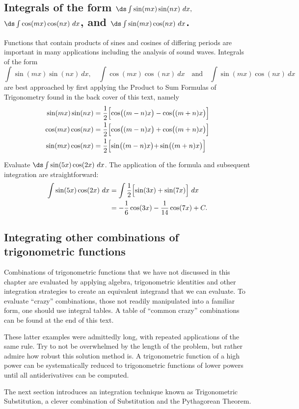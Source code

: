 \subsection{\texorpdfstring{Integrals of the form $\ds \int\sin(mx)\sin(nx)\ dx,$ $\ds\int \cos(mx)\cos(nx)\ dx$, and $\ds\int \sin(mx)\cos(nx)\ dx$.}{Integrands of the form sin(mx)sin(nx), cos(mx)cos(nx), and sin(mx)cos(nx)}}

Functions that contain products of sines and cosines of differing periods are important in many applications including the analysis of sound waves. Integrals of the form 
\[
\int\sin(mx)\sin(nx)\ dx,\quad \int \cos(mx)\cos(nx)\ dx \quad \text{and}\quad\int \sin(mx)\cos(nx)\ dx
\]
are best approached by first applying the Product to Sum Formulas of Trigonometry found in the back cover of this text, namely
\begin{align*}
\sin(mx)\sin(nx) &= \frac12\Bigl[\cos\bigl((m-n)x\bigr)-\cos\bigl((m+n)x\bigr)\Bigr] \\
\cos(mx)\cos(nx) &= \frac12\Bigl[\cos\bigl((m-n)x\bigr)+\cos\bigl((m+n)x\bigr)\Bigr] \\
\sin(mx)\cos(nx) &=	\frac12\Bigl[\sin\bigl((m-n)x\bigl)+\sin\bigl((m+n)x\bigr)\Bigr]
\end{align*}

\begin{example}\label{ex_trigint4}
Evaluate $\ds\int\sin(5x)\cos(2x)\ dx$.
\solution
The application of the formula and subsequent integration are straightforward:
\begin{align*}
	\int\sin(5x)\cos(2x)\ dx
	&= \int \frac12\Bigl[\sin(3x)+\sin(7x)\Bigr]\ dx \\
	&= -\frac16\cos(3x) - \frac1{14}\cos(7x) + C.
\end{align*}
\end{example}

\subsection{Integrating other combinations of trigonometric functions}

Combinations of trigonometric functions that we have not discussed in this chapter are evaluated by applying algebra, trigonometric identities and other integration strategies to create an equivalent integrand that we can evaluate. To evaluate ``crazy'' combinations, those not readily manipulated into a familiar form, one should use integral tables. A table of ``common crazy'' combinations can be found at the end of this text.

These latter examples were admittedly long, with repeated applications of the same rule. Try to not be overwhelmed by the length of the problem, but rather admire how robust this solution method is. A trigonometric function of a high power can be systematically reduced to trigonometric functions of lower powers until all antiderivatives can be computed. 

The next section introduces an integration technique known as Trigonometric Substitution, a clever combination of Substitution and the Pythagorean Theorem.

